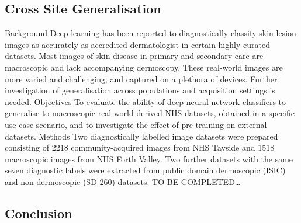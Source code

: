 \subsection*{Cross Site Generalisation}
Background Deep learning has been reported to diagnostically classify skin lesion images as accurately as accredited dermatologist in certain highly curated datasets. Most images of skin disease in primary and secondary care are macroscopic and lack accompanying dermoscopy. These real-world images are more varied and challenging, and captured on a plethora of devices. Further investigation of generalisation across populations and acquisition settings is needed. 
Objectives To evaluate the ability of deep neural network classifiers to generalise to macroscopic real-world derived NHS datasets, obtained in a specific use case scenario, and to investigate the effect of pre-training on external datasets. 
Methods Two diagnostically labelled image datasets were prepared consisting of 2218 community-acquired images from NHS Tayside and 1518 macroscopic images from NHS Forth Valley. Two further datasets with the same seven diagnostic labels were extracted from public domain dermoscopic (ISIC) and non-dermoscopic (SD-260) datasets. TO BE COMPLETED…

\subsection*{Conclusion}
